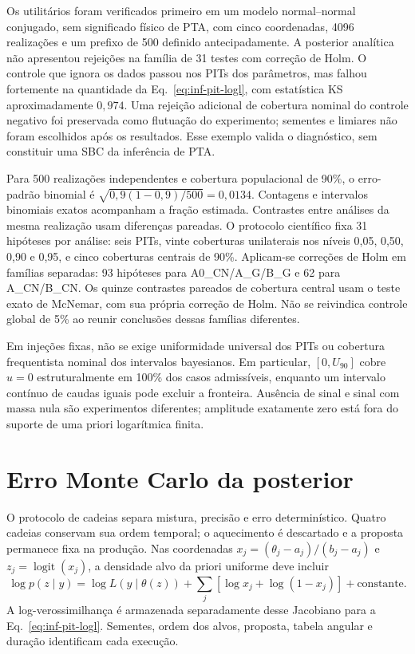 Os utilitários foram verificados primeiro em um modelo normal--normal
conjugado, sem significado físico de PTA, com cinco coordenadas,
4096 realizações e um prefixo de 500 definido antecipadamente. A
posterior analítica não apresentou rejeições na família de 31 testes
com correção de Holm. O controle que ignora os dados passou nos PITs
dos parâmetros, mas falhou fortemente na quantidade da
Eq.~\eqref{eq:inf-pit-logl}, com estatística KS aproximadamente
\(0{,}974\). Uma rejeição adicional de cobertura nominal do controle
negativo foi preservada como flutuação do experimento; sementes e
limiares não foram escolhidos após os resultados. Esse exemplo valida
o diagnóstico, sem constituir uma SBC da inferência de PTA.

Para 500 realizações independentes e cobertura populacional de 90\%,
o erro-padrão binomial é
\(\sqrt{0{,}9(1-0{,}9)/500}=0{,}0134\).
Contagens e intervalos binomiais exatos acompanham a fração estimada.
Contrastes entre análises da mesma realização usam diferenças pareadas.
O protocolo científico fixa 31 hipóteses por análise: seis PITs, vinte
coberturas unilaterais nos níveis 0,05, 0,50, 0,90 e 0,95, e cinco
coberturas centrais de 90\%. Aplicam-se correções de Holm em famílias
separadas: 93 hipóteses para A0\_CN/A\_G/B\_G e 62 para A\_CN/B\_CN.
Os quinze contrastes pareados de cobertura central usam o teste exato
de McNemar, com sua própria correção de Holm. Não se reivindica controle
global de 5\% ao reunir conclusões dessas famílias diferentes.

Em injeções fixas, não se exige uniformidade universal dos PITs ou
cobertura frequentista nominal dos intervalos bayesianos. Em particular,
\([0,U_{90}]\) cobre \(u=0\) estruturalmente em 100\% dos casos
admissíveis, enquanto um intervalo contínuo de caudas iguais pode
excluir a fronteira. Ausência de sinal e sinal com massa nula são
experimentos diferentes; amplitude exatamente zero está fora do suporte
de uma priori logarítmica finita.

\section{Erro Monte Carlo da posterior}

O protocolo de cadeias separa mistura, precisão e erro determinístico.
Quatro cadeias conservam sua ordem temporal; o aquecimento é descartado
e a proposta permanece fixa na produção. Nas coordenadas
\(x_j=(\theta_j-a_j)/(b_j-a_j)\) e \(z_j=\operatorname{logit}(x_j)\),
a densidade alvo da priori uniforme deve incluir
\begin{equation}
 \log p(z\mid y)=\log L(y\mid\theta(z))+
       \sum_j[\log x_j+\log(1-x_j)]+\text{constante}.
 \label{eq:inf-jacobiano-logit}
\end{equation}
A log-verossimilhança é armazenada separadamente desse Jacobiano para
a Eq.~\eqref{eq:inf-pit-logl}. Sementes, ordem dos alvos, proposta,
tabela angular e duração identificam cada execução.

